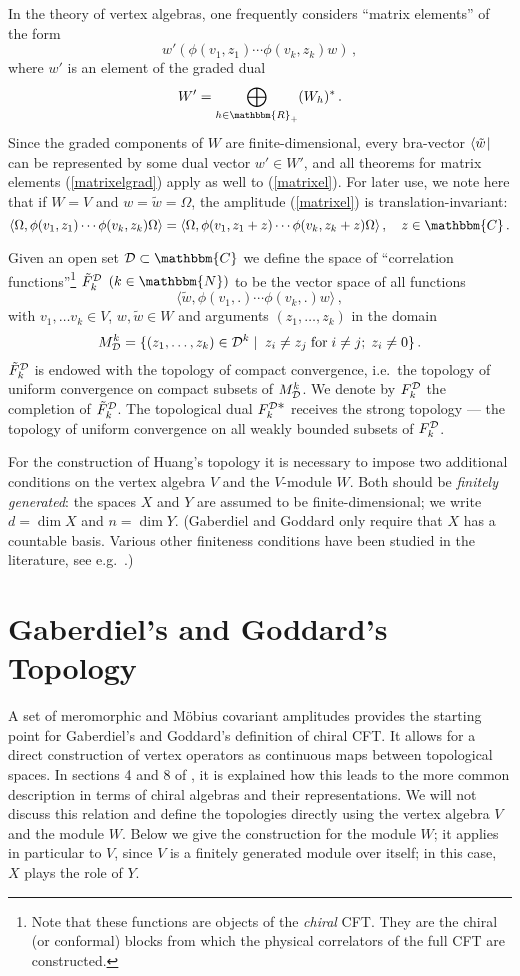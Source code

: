 \documentclass[a4paper,12pt,twoside]{article}
\renewcommand{\b}{\langle}
\renewcommand{\k}{\rangle}
\renewcommand{\c}[1]{{\cal #1}}
\newcommand{\bN}{\mathbbm{N}}
\newcommand{\bC}{\mathbbm{C}}
\newcommand{\bR}{\mathbbm{R}}
\newcommand{\eq}[1]{(\ref{#1})}
\newcommand{\D}{\c{D}}
\newcommand{\Fd}{F^{\D}_k}
\newcommand{\hF}{\tilde{F}}
\newcommand{\hFd}{\hF^{\D}_k}
\newcommand{\Fdd}{F^{\D{\textstyle *}}_k}
\newcommand{\Md}{M^k_{\D}}
\newcommand{\wt}{\tilde{w}}
\begin{document}
In the theory of vertex algebras, one frequently considers
``matrix elements'' of the form
\begin{equation}
\label{matrixelgrad}
w'(\phi(v_1,z_1)\cdots\phi(v_k,z_k)w)\,,
\end{equation}
where $w'$ is an element of the graded dual
$$W' = \bigoplus_{h\in\bR_+} (W_h)^*\,.$$
Since the graded components of $W$ are finite-dimensional,
every bra-vector $\b\wt\hspace{0.3mm}|$ can be represented
by some dual vector $w'\in W'$, and all theorems
for matrix elements \eq{matrixelgrad} apply as well to \eq{matrixel}.
For later use, we note here that if $W = V$ and $w = \wt = \Omega$,
the amplitude \eq{matrixel} is translation-invariant:
$$\b\Omega,\phi(v_1,z_1)\cdots\phi(v_k,z_k)\Omega\k
= \b\Omega,\phi(v_1,z_1+z)\cdots\phi(v_k,z_k+z)\Omega\k\,,\quad z\in\bC\,.$$

Given an open set $\D\subset\bC$ we define the space
of ``correlation functions''\footnote{Note that these functions are
objects of the {\it chiral} CFT. They are the chiral (or conformal)
blocks from which the
physical correlators of the full CFT are constructed.}
$\hFd$ $(k\in\bN)$ to be the vector space of all functions
$$\b \wt,\phi(v_1,.)\cdots\phi(v_k,.)w\k\,,$$
with $v_1,\ldots v_k\in V$, $w,\wt\in W$ and arguments $(z_1,\ldots,z_k)$
in the domain
$$\Md = \{(z_1,\ldots,z_k)\in \D^k\;|\; \;z_i\ne
z_j\;\mbox{for}\; i\ne j;\; z_i \neq 0\}\,.$$
$\hFd$ is endowed with the topology of compact convergence,
i.e.\ the topology of uniform convergence on compact subsets of
$\Md$. We denote by $\Fd$ the completion of $\hFd$.
The topological dual $\Fdd$ receives the strong topology --- the topology
of uniform convergence on all weakly bounded subsets of $\Fd$.

For the construction of Huang's topology it is necessary to impose
two additional conditions on the vertex algebra $V$ and the
$V$-module $W$. Both should be {\it finitely generated}:
the spaces $X$ and $Y$ are assumed to be finite-dimensional; we write
$d = \dim X$ and $n = \dim Y$. (Gaberdiel and Goddard only require that $X$
has a countable basis. Various other finiteness conditions have been studied
in the literature, see e.g.\ \cite{Nagatomo}.)


\section{Gaberdiel's and Goddard's Topology}
\label{Gaberdiels_and_Goddards_Topology}
A set of meromorphic and M\"{o}bius covariant amplitudes provides
the starting point for Gaberdiel's and Goddard's definition of chiral
CFT. It allows for a direct construction of vertex operators as continuous
maps between topological spaces. In sections 4 and 8 of \cite{Gaberdiel},
it is explained how this leads to the more common description
in terms of chiral algebras and their representations.
We will not discuss this relation and define the topologies
directly using the vertex algebra $V$ and the module $W$.
Below we give the construction for the module $W$;
it applies in particular to $V$, since $V$ is a finitely generated
module over itself; in this case, $X$ plays the role of $Y$.
\end{document}
